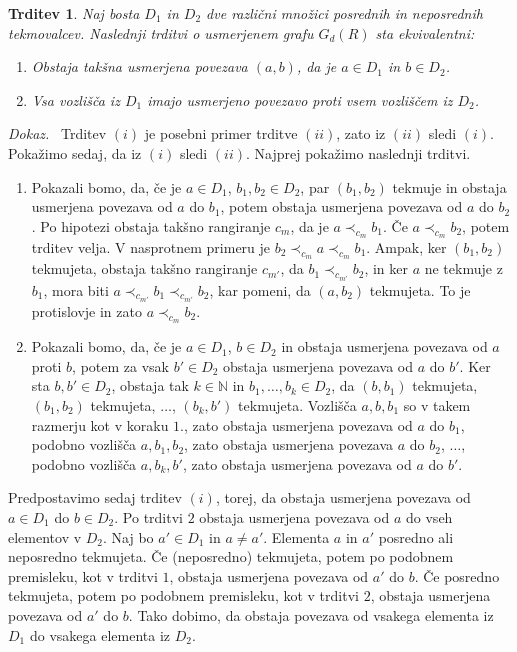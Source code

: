 \documentclass[a4paper, 12pt]{book}
\newtheorem{trditev}{Trditev}[chapter]
\newenvironment{dokaz}{\emph{Dokaz.}\ }{\hspace{\fill}{$\Box$}}
\begin{document}
\begin{trditev}
\label{trditev_ekvivalenc_mnozic_posrednih_tekmovalcev}
    Naj bosta $D_1$ in $D_2$ dve različni množici posrednih in neposrednih tekmovalcev. Naslednji trditvi o usmerjenem grafu $G_d(R)$ sta ekvivalentni:
    \begin{enumerate}[label=(\roman*)]
        \item Obstaja takšna usmerjena povezava $(a, b)$, da je $a \in D_1$ in $b \in D_2$.
        \item Vsa vozlišča iz $D_1$ imajo usmerjeno povezavo proti vsem vozliščem iz $D_2$.
    \end{enumerate}
\end{trditev}
\begin{dokaz}
    Trditev $(i)$ je posebni primer trditve $(ii)$, zato iz $(ii)$ sledi $(i)$. Pokažimo sedaj, da iz $(i)$ sledi $(ii)$. Najprej pokažimo naslednji trditvi.

    \begin{enumerate}
        \item Pokazali bomo, da, če je $a \in D_1$, $b_1, b_2 \in D_2$, par $(b_1, b_2)$ tekmuje in obstaja usmerjena povezava od $a$ do $b_1$, potem obstaja usmerjena povezava od $a$ do $b_2$. Po hipotezi obstaja takšno rangiranje $c_m$, da je $a \prec_{c_m} b_1$. Če $a \prec_{c_m} b_2$, potem trditev velja. V nasprotnem primeru je $b_2 \prec_{c_m} a \prec_{c_m} b_1$. Ampak, ker $(b_1, b_2)$ tekmujeta, obstaja takšno rangiranje $c_{m'}$, da $b_1 \prec_{c_{m'}} b_2$, in ker $a$ ne tekmuje z $b_1$, mora biti $a \prec_{c_{m'}} b_1 \prec_{c_{m'}} b_2$, kar pomeni, da $(a, b_2)$ tekmujeta. To je protislovje in zato $a \prec_{c_m} b_2$.
        \item Pokazali bomo, da, če je $a \in D_1$, $b \in D_2$ in obstaja usmerjena povezava od $a$ proti $b$, potem za vsak $b' \in D_2$ obstaja usmerjena povezava od $a$ do $b'$. Ker sta $b, b' \in D_2$, obstaja tak $k \in \mathbb{N}$ in $b_1, \dots, b_k \in D_2$, da $(b, b_1)$ tekmujeta, $(b_1, b_2)$ tekmujeta, $\dots$, $(b_k, b')$ tekmujeta. Vozlišča $a, b, b_1$ so v takem razmerju kot v koraku $1.$, zato obstaja usmerjena povezava od $a$ do $b_1$, podobno vozlišča $a, b_1, b_2$, zato obstaja usmerjena povezava $a$ do $b_2$, $\dots$, podobno vozlišča $a, b_k, b'$, zato obstaja usmerjena povezava od $a$ do $b'$.
    \end{enumerate}
        
    Predpostavimo sedaj trditev $(i)$, torej, da obstaja usmerjena povezava od $a \in D_1$ do $b \in D_2$. Po trditvi $2$ obstaja usmerjena povezava od $a$ do vseh elementov v $D_2$. 
    Naj bo $a' \in D_1$ in $a \neq a'$. Elementa $a$ in $a'$ posredno ali neposredno tekmujeta. Če (neposredno) tekmujeta, potem po podobnem premisleku, kot v trditvi $1$, obstaja usmerjena povezava od $a'$ do $b$. Če posredno tekmujeta, potem po podobnem premisleku, kot v trditvi $2$, obstaja usmerjena povezava od $a'$ do $b$. Tako dobimo, da obstaja povezava od vsakega elementa iz $D_1$ do vsakega elementa iz $D_2$.
\end{dokaz}
\end{document}
